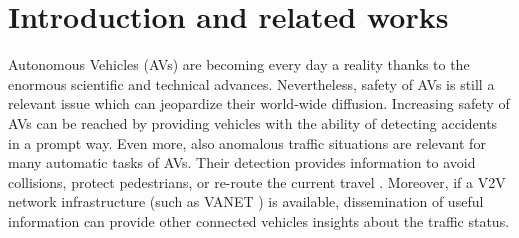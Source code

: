 \section{Introduction and related works}
Autonomous Vehicles (AVs) are becoming every day a reality thanks to the enormous scientific and technical advances. Nevertheless, safety of AVs is still a relevant issue which can jeopardize their world-wide diffusion.
Increasing safety of AVs can be reached by providing vehicles with the ability of detecting accidents in a prompt way.
Even more, also anomalous traffic situations are relevant for many automatic tasks of AVs.
Their detection provides information to avoid collisions, protect pedestrians, or re-route the current travel \cite{4298901}.
Moreover, if a V2V network infrastructure (such as VANET \cite{fatemidokht2021efficient}) is available, dissemination of useful information can provide other connected vehicles insights about the traffic status. 

